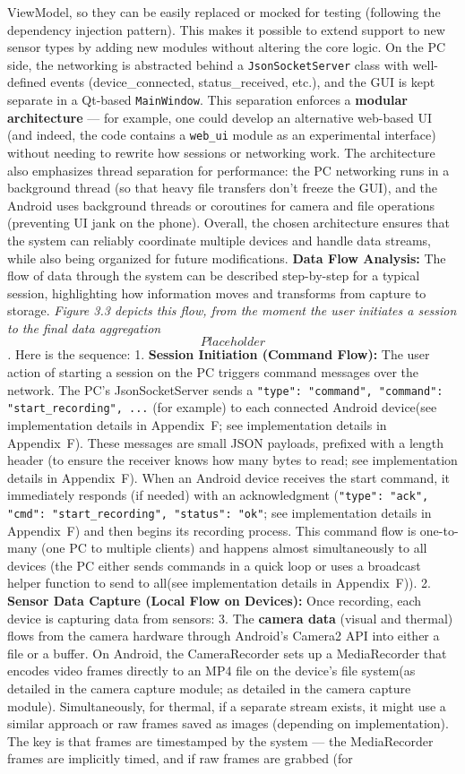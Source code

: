 ViewModel, so they can be easily replaced or mocked for testing (following the dependency injection pattern). This makes it possible to extend support to new sensor types by adding new modules without altering the core logic. On the PC side, the networking is abstracted behind a \texttt{JsonSocketServer} class with well-defined events (device_connected, status_received, etc.), and the GUI is kept separate in a Qt-based \texttt{MainWindow}. This separation enforces a \textbf{modular architecture} --- for example, one could develop an alternative web-based UI (and indeed, the code contains a \texttt{web\_ui} module as an experimental interface) without needing to rewrite how sessions or networking work. The architecture also emphasizes thread separation for performance: the PC networking runs in a background thread (so that heavy file transfers don't freeze the GUI), and the Android uses background threads or coroutines for camera and file operations (preventing UI jank on the phone). Overall, the chosen architecture ensures that the system can reliably coordinate multiple devices and handle data streams, while also being organized for future modifications. \textbf{Data Flow Analysis:} The flow of data through the system can be described step-by-step for a typical session, highlighting how information moves and transforms from capture to storage. \textit{Figure 3.3 depicts this flow, from the moment the user initiates a session to the final data aggregation \[Placeholder\].} Here is the sequence: 1. \textbf{Session Initiation (Command Flow):} The user action of starting a session on the PC triggers command messages over the network. The PC's JsonSocketServer sends a \texttt{{"type": "command", "command": "start_recording", ...}} (for example) to each connected Android device(see implementation details in Appendix~F; see implementation details in Appendix~F). These messages are small JSON payloads, prefixed with a length header (to ensure the receiver knows how many bytes to read; see implementation details in Appendix~F). When an Android device receives the start command, it immediately responds (if needed) with an acknowledgment (\texttt{{"type": "ack", "cmd": "start_recording", "status": "ok"}}; see implementation details in Appendix~F) and then begins its recording process. This command flow is one-to-many (one PC to multiple clients) and happens almost simultaneously to all devices (the PC either sends commands in a quick loop or uses a broadcast helper function to send to all(see implementation details in Appendix~F)). 2. \textbf{Sensor Data Capture (Local Flow on Devices):} Once recording, each device is capturing data from sensors: 3. The \textbf{camera data} (visual and thermal) flows from the camera hardware through Android's Camera2 API into either a file or a buffer. On Android, the CameraRecorder sets up a MediaRecorder that encodes video frames directly to an MP4 file on the device's file system(as detailed in the camera capture module; as detailed in the camera capture module). Simultaneously, for thermal, if a separate stream exists, it might use a similar approach or raw frames saved as images (depending on implementation). The key is that frames are timestamped by the system --- the MediaRecorder frames are implicitly timed, and if raw frames are grabbed (for 